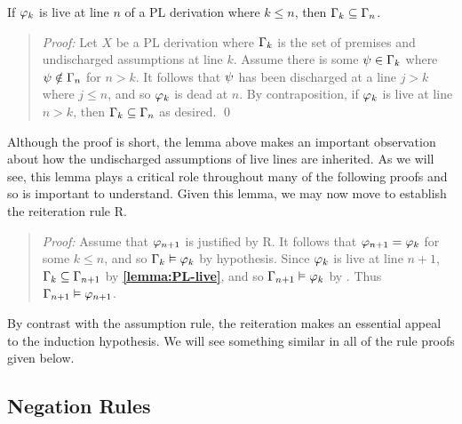 \begin{Lthm} \label{lemma:PL-live}
  If $\varphi_k$ is live at line $n$ of a PL derivation where $k\leq n$, then $\Gamma_k\subseteq \Gamma_n$.
\end{Lthm}
\vspace{-.2in}

\begin{quote} 
  \textit{Proof:} Let $X$ be a PL derivation where $\Gamma_k$ is the set of premises and undischarged assumptions at line $k$.
  Assume there is some $\psi \in \Gamma_k$ where $\psi \notin \Gamma_n$ for $n > k$.
  It follows that $\psi$ has been discharged at a line $j > k$ where $j \leq n$, and so $\varphi_k$ is dead at $n$.
  By contraposition, if $\varphi_k$ is live at line $n > k$, then $\Gamma_k\subseteq \Gamma_n$ as desired.
  \qed
\end{quote}

Although the proof is short, the lemma above makes an important observation about how the undischarged assumptions of live lines are inherited.
As we will see, this lemma plays a critical role throughout many of the following proofs and so is important to understand.
Given this lemma, we may now move to establish the reiteration rule R.


\begin{quote} 
  \textit{Proof:} Assume that $\varphi_{n+1}$ is justified by R.
  It follows that $\varphi_{n+1}=\varphi_{k}$ for some $k\leq n$, and so $\Gamma_k \vDash \varphi_k$ by hypothesis.
  Since $\varphi_k$ is live at line $n+1$, $\Gamma_k\subseteq \Gamma_{n+1}$ by \textbf{\ref{lemma:PL-live}}, and so $\Gamma_{n+1} \vDash \varphi_{k}$ by .
  Thus $\Gamma_{n+1} \vDash \varphi_{n+1}$.
\end{quote}

By contrast with the assumption rule, the reiteration makes an essential appeal to the induction hypothesis.
We will see something similar in all of the rule proofs given below.



\subsection{Negation Rules}%
  \label{sub:NegationRules}

